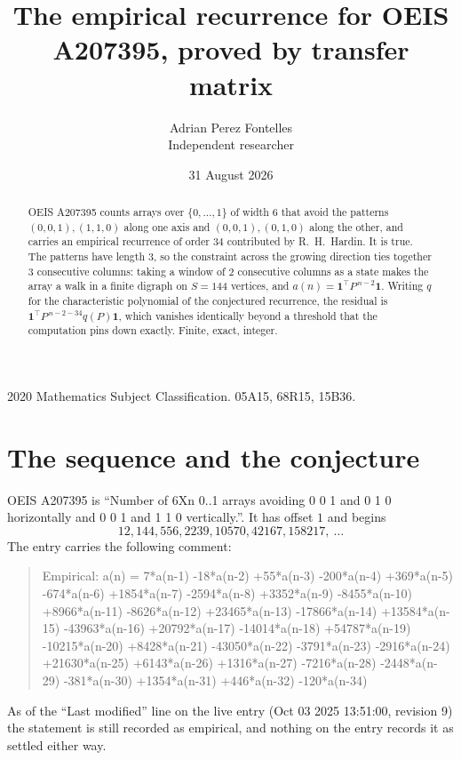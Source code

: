 \documentclass[11pt,a4paper]{article}
\title{The empirical recurrence for OEIS A207395, proved by transfer matrix}
\author{Adrian Perez Fontelles\\ \small Independent researcher}
\date{31 August 2026}
\theoremstyle{plain}
\theoremstyle{definition}
\begin{document}
\maketitle

\begin{abstract}
OEIS A207395 counts arrays over $\{0,\dots,1\}$ of width $6$ that avoid the patterns
$(0,0,1), (1,1,0)$ along one axis and $(0,0,1), (0,1,0)$ along the other, and carries an empirical recurrence of
order $34$ contributed by R.~H.~Hardin. It is true. The patterns have length $3$, so
the constraint across the growing direction ties together $3$ consecutive columns: taking a
window of $2$ consecutive columns as a state makes the array a walk in a finite digraph
on $S=144$ vertices, and $a(n)=\mathbf{1}^{\!\top}P^{\,n-2}\mathbf{1}$. Writing $q$
for the characteristic polynomial of the conjectured recurrence, the residual is
$\mathbf{1}^{\!\top}P^{\,n-2-34}q(P)\mathbf{1}$, which vanishes identically
beyond a threshold that the computation pins down exactly. Finite, exact, integer.
\end{abstract}

\noindent\small 2020 Mathematics Subject Classification. 05A15, 68R15, 15B36.\normalsize

\section{The sequence and the conjecture}

OEIS A207395 is ``Number of 6Xn 0..1 arrays avoiding 0 0 1 and 0 1 0 horizontally and 0 0 1 and 1 1 0 vertically.''. It has offset
$1$ and begins
\[
12, 144, 556, 2239, 10570, 42167, 158217,\ \dots
\]
The entry carries the following comment:
\begin{quote}\small
Empirical: a(n) = 7*a(n-1) -18*a(n-2) +55*a(n-3) -200*a(n-4) +369*a(n-5) -674*a(n-6) +1854*a(n-7) -2594*a(n-8) +3352*a(n-9) -8455*a(n-10) +8966*a(n-11) -8626*a(n-12) +23465*a(n-13) -17866*a(n-14) +13584*a(n-15) -43963*a(n-16) +20792*a(n-17) -14014*a(n-18) +54787*a(n-19) -10215*a(n-20) +8428*a(n-21) -43050*a(n-22) -3791*a(n-23) -2916*a(n-24) +21630*a(n-25) +6143*a(n-26) +1316*a(n-27) -7216*a(n-28) -2448*a(n-29) -381*a(n-30) +1354*a(n-31) +446*a(n-32) -120*a(n-34)
\end{quote}
As of the ``Last modified'' line on the live entry (Oct 03 2025 13:51:00, revision
9) the statement is still recorded as empirical, and nothing on the entry
records it as settled either way.
\end{document}
